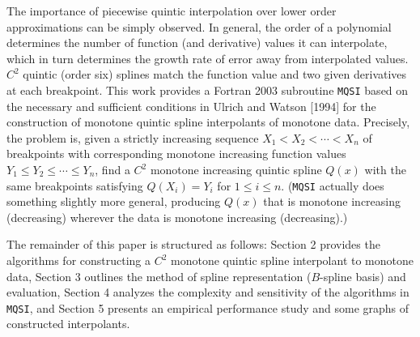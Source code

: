 The importance of piecewise quintic interpolation over lower order
approximations can be simply observed. In general, the order of a
polynomial determines the number of function (and derivative) values
it can interpolate, which in turn determines the growth rate of error
away from interpolated values. $C^2$ quintic (order six) splines
match the function value and two given derivatives at each breakpoint.
This work provides a Fortran 2003 subroutine {\tt MQSI} based on the
necessary and sufficient conditions in Ulrich and Watson [1994] for the
construction of monotone quintic spline interpolants of monotone data.
Precisely, the problem is, given a strictly increasing sequence $X_1<X_2<
\cdots <X_n$ of breakpoints with corresponding monotone increasing
function values $Y_1\le Y_2\le \cdots \le Y_n$, find a $C^2$ monotone
increasing quintic spline $Q(x)$ with the same breakpoints satisfying
$Q(X_i)=Y_i$ for $1\le i\le n$. ({\tt MQSI} actually does something slightly
more general, producing $Q(x)$ that is monotone increasing (decreasing)
wherever the data is monotone increasing (decreasing).)

The remainder of this paper is structured as follows: Section 2 provides
the algorithms for constructing a $C^2$ monotone quintic spline interpolant
to monotone data, Section 3 outlines the method of spline representation
($B$-spline basis) and evaluation, Section 4 analyzes the complexity and
sensitivity of the algorithms in {\tt MQSI}, and Section 5 presents an
empirical performance study and some graphs of constructed interpolants.

